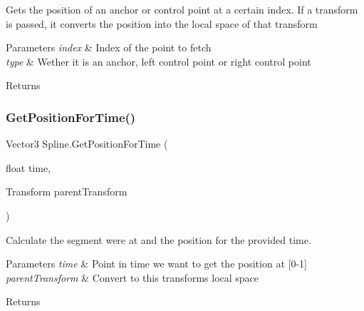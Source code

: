 Gets the position of an anchor or control point at a certain index. If a transform is passed, it converts the position into the local space of that transform 


\begin{DoxyParams}{Parameters}
{\em index} & Index of the point to fetch \\
\hline
{\em type} & Wether it is an anchor, left control point or right control point \\
\hline
\end{DoxyParams}
\begin{DoxyReturn}{Returns}

\end{DoxyReturn}
\mbox{\label{class_spline_a2fe054cea6de6ba365d29a15ff37696e}} 
\subsubsection{\texorpdfstring{Get\+Position\+For\+Time()}{GetPositionForTime()}}
{\footnotesize\ttfamily Vector3 Spline.\+Get\+Position\+For\+Time (\begin{DoxyParamCaption}\item[{float}]{time,  }\item[{Transform}]{parent\+Transform }\end{DoxyParamCaption})}



Calculate the segment we\textquotesingle{}re at and the position for the provided time. 


\begin{DoxyParams}{Parameters}
{\em time} & Point in time we want to get the position at \mbox{[}0-\/1\mbox{]}\\
\hline
{\em parent\+Transform} & Convert to this transform\textquotesingle{}s local space\\
\hline
\end{DoxyParams}
\begin{DoxyReturn}{Returns}

\end{DoxyReturn}
\mbox{\label{class_spline_a4dd656d9e96338baa6225ed4d781a943}} 
